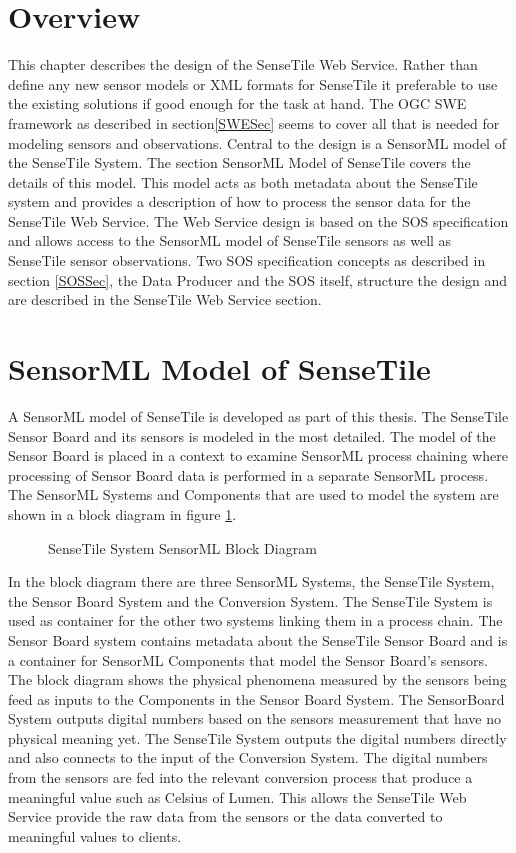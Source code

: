 \documentclass[]{final_report}
\begin{document}
\section{Overview}
This chapter describes the design of the SenseTile Web Service. Rather than define any new sensor models or XML formats for SenseTile it preferable to use the existing solutions if good enough for the task at hand. The OGC SWE framework as described in section\ref{SWESec} seems to cover all that is needed for modeling sensors and observations. Central to the design is a SensorML model of the SenseTile System. The section SensorML Model of SenseTile covers the details of this model. This model acts as both metadata about the SenseTile system and provides a description of how to process the sensor data for the SenseTile Web Service.
The Web Service design is based on the SOS specification and allows access to the SensorML model of SenseTile sensors as well as SenseTile sensor observations. Two SOS specification concepts as described in section \ref{SOSSec}, the Data Producer and the SOS itself, structure the design and are described in the SenseTile Web Service section.

\section{SensorML Model of SenseTile}\label{SenseTileModelSec}

A SensorML model of SenseTile is developed as part of this thesis. The SenseTile Sensor Board and its sensors is modeled in the most detailed. The model of the Sensor Board is placed in a context to examine SensorML process chaining where processing of Sensor Board data is performed in a separate SensorML process.  The SensorML Systems and Components that are used to model the system are shown in a  block diagram in figure \ref{fig:SensorML_SenseTile_System_comp}.

\begin{figure}[h]
\centering
{}
\caption{SenseTile System SensorML Block Diagram}\label{fig:SensorML_SenseTile_System_comp}
\end{figure}

In the block diagram there are three SensorML Systems, the SenseTile System, the Sensor Board System and the Conversion System. The SenseTile System is used as container for the other two systems linking them in a process chain. The Sensor Board system contains metadata about the SenseTile Sensor Board and is a container for SensorML Components that model the Sensor Board's sensors. The block diagram shows the physical phenomena measured by the sensors being feed as inputs to the Components in the Sensor Board System. The SensorBoard System outputs digital numbers based on the sensors measurement that have no physical meaning yet. The SenseTile System outputs the digital numbers directly and also connects to the input of the Conversion System. The digital numbers from the sensors are fed into the relevant conversion process that produce a meaningful value such as Celsius of Lumen. This allows the SenseTile Web Service provide the raw data from the sensors or the data converted to meaningful values to clients.
\end{document}
